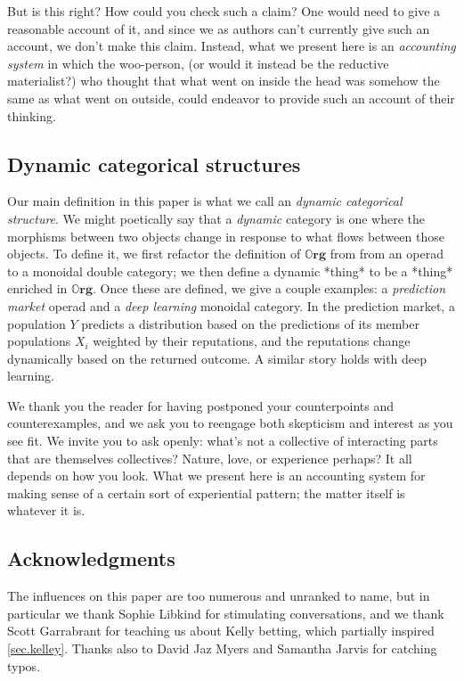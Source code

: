 \documentclass{eptcs}
\theoremstyle{definition}
\theoremstyle{plain}
\newcommand{\Cat}[1]{\textbf{#1}}%
\newcommand{\0}{\textsf{0}}
\newcommand{\1}{\tn{\textsf{1}}}
\newcommand{\org}{{\mathbb{O}\Cat{rg}}}
\begin{document}
But is this right? How could you check such a claim? One would need to give a reasonable account of it, and since we as authors can't currently give such an account, we don't make this claim. Instead, what we present here is an \emph{accounting system} in which the woo-person, (or would it instead be the reductive materialist?) who thought that what went on inside the head was somehow the same as what went on outside, could endeavor to provide such an account of their thinking.

\subsection{Dynamic categorical structures}

Our main definition in this paper is what we call an \emph{dynamic categorical structure}. We might poetically say that a \emph{dynamic} category is one where the morphisms between two objects change in response to what flows between those objects. To define it, we first refactor the definition of $\org$ from \cite{spivak2021learners} from an operad to a monoidal double category; we then define a dynamic *thing* to be a *thing* enriched in $\org$. Once these are defined, we give a couple examples: a \emph{prediction market} operad and a \emph{deep learning} monoidal category. In the prediction market, a population $Y$ predicts a distribution based on the predictions of its member populations $X_i$ weighted by their reputations, and the reputations change dynamically based on the returned outcome. A similar story holds with deep learning.

We thank you the reader for having postponed your counterpoints and counterexamples, and we ask you to reengage both skepticism and interest as you see fit. We invite you to ask openly: what's not a collective of interacting parts that are themselves collectives? Nature, love, or experience perhaps? It all depends on how you look. What we present here is an accounting system for making sense of a certain sort of experiential pattern; the matter itself is whatever it is.

\subsection{Acknowledgments}

The influences on this paper are too numerous and unranked to name, but in particular we thank Sophie Libkind for stimulating conversations, and we thank Scott Garrabrant for teaching us about Kelly betting, which partially inspired \cref{sec.kelley}. Thanks also to David Jaz Myers and Samantha Jarvis for catching typos.
\end{document}
